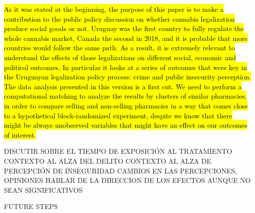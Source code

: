 \documentclass[11pt]{article}
\begin{document}
\hl{As it was stated at the beginning, the purpose of this paper is to make a contribution to the public policy discussion on whether cannabis legalization produce social goods or not. Uruguay was the first country to fully regulate the whole cannabis market, Canada the second in 2018, and it is probable that more countries would follow the same path. As a result, it is extremely relevant to understand the effects of those legalizations on different social, economic and political outcomes. In particular it looks at a series of outcomes that were key in the Uruguayan legalization policy process: crime and public insecurity perception. The data analysis presented in this version is a first cut. We need to perform a computational matching to analyze the results by clusters of similar pharmacies, in order to compare selling and non-selling pharmacies in a way that comes close to a hypothetical block-randomized experiment, despite we know that there might be always unobserved variables that might have an effect on our outcomes of interest.}


DISCUTIR SOBRE EL TIEMPO DE EXPOSICIÓN AL TRATAMIENTO
CONTEXTO AL ALZA DEL DELITO
CONTEXTO AL ALZA DE PERCEPCIÓN DE INSEGURIDAD
CAMBIOS EN LAS PERCEPCIONES, OPINIONES
HABLAR DE LA DIRECCION DE LOS EFECTOS AUNQUE NO SEAN SIGNIFICATIVOS

FUTURE STEPS

\printbibliography[title={8 References}]

\newpage
\appendix %
\setcounter{mycounter}{0}\textbf{}
\let\osection\section
\renewcommand{\section}{\stepcounter{mycounter}\osection}
\renewcommand\thesection{Appendix \Alph{mycounter}}
\end{document}
